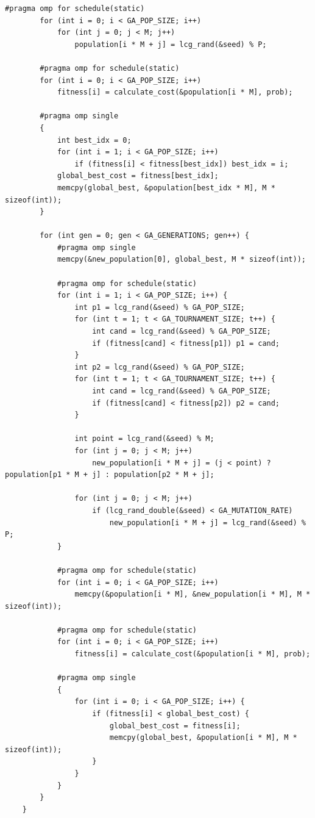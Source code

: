 \documentclass[12pt]{article}
\begin{document}
\begin{lstlisting}[style=code]
        #pragma omp for schedule(static)
        for (int i = 0; i < GA_POP_SIZE; i++)
            for (int j = 0; j < M; j++)
                population[i * M + j] = lcg_rand(&seed) % P;

        #pragma omp for schedule(static)
        for (int i = 0; i < GA_POP_SIZE; i++)
            fitness[i] = calculate_cost(&population[i * M], prob);

        #pragma omp single
        {
            int best_idx = 0;
            for (int i = 1; i < GA_POP_SIZE; i++)
                if (fitness[i] < fitness[best_idx]) best_idx = i;
            global_best_cost = fitness[best_idx];
            memcpy(global_best, &population[best_idx * M], M * sizeof(int));
        }

        for (int gen = 0; gen < GA_GENERATIONS; gen++) {
            #pragma omp single
            memcpy(&new_population[0], global_best, M * sizeof(int));

            #pragma omp for schedule(static)
            for (int i = 1; i < GA_POP_SIZE; i++) {
                int p1 = lcg_rand(&seed) % GA_POP_SIZE;
                for (int t = 1; t < GA_TOURNAMENT_SIZE; t++) {
                    int cand = lcg_rand(&seed) % GA_POP_SIZE;
                    if (fitness[cand] < fitness[p1]) p1 = cand;
                }
                int p2 = lcg_rand(&seed) % GA_POP_SIZE;
                for (int t = 1; t < GA_TOURNAMENT_SIZE; t++) {
                    int cand = lcg_rand(&seed) % GA_POP_SIZE;
                    if (fitness[cand] < fitness[p2]) p2 = cand;
                }

                int point = lcg_rand(&seed) % M;
                for (int j = 0; j < M; j++)
                    new_population[i * M + j] = (j < point) ? population[p1 * M + j] : population[p2 * M + j];

                for (int j = 0; j < M; j++)
                    if (lcg_rand_double(&seed) < GA_MUTATION_RATE)
                        new_population[i * M + j] = lcg_rand(&seed) % P;
            }

            #pragma omp for schedule(static)
            for (int i = 0; i < GA_POP_SIZE; i++)
                memcpy(&population[i * M], &new_population[i * M], M * sizeof(int));

            #pragma omp for schedule(static)
            for (int i = 0; i < GA_POP_SIZE; i++)
                fitness[i] = calculate_cost(&population[i * M], prob);

            #pragma omp single
            {
                for (int i = 0; i < GA_POP_SIZE; i++) {
                    if (fitness[i] < global_best_cost) {
                        global_best_cost = fitness[i];
                        memcpy(global_best, &population[i * M], M * sizeof(int));
                    }
                }
            }
        }
    }


\end{lstlisting}
\end{document}
